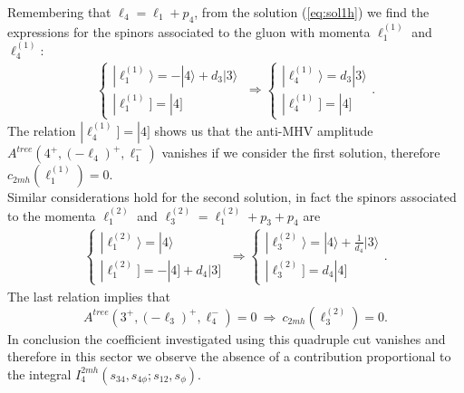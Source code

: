 Remembering that $\ell_4=\ell_1+p_4$, from the solution (\ref{eq:sol1h}) we find the expressions for the spinors associated to the gluon with momenta $\ell_1^{(1)}$ and $\ell_4^{(1)}$:
\begin{align}
	\begin{cases}
		|\ell_1^{(1)}\rangle=-|4\rangle+d_3|3\rangle \\
		|\ell_1^{(1)}]=|4]
	\end{cases} \ \Rightarrow 
	\begin{cases}
		|\ell_4^{(1)}\rangle=d_3|3\rangle \\
		|\ell_4^{(1)}]=|4]
	\end{cases}
	\label{quadA}.
\end{align}
The relation $|\ell_4^{(1)}]=|4]$ shows us that the anti-MHV amplitude $A^{tree}(4^+,(-\ell_4)^+, \ell_1^-)$ vanishes if we consider the first solution, therefore
$
	c_{2mh}(\ell_1^{(1)})=0
$.\\
Similar considerations hold for the second solution, in fact the spinors associated to the momenta $\ell_1^{(2)}$ and $\ell_3^{(2)}=\ell_1^{(2)}+p_3+p_4$ are
\begin{align}
	\begin{cases}
		|\ell_1^{(2)}\rangle=|4\rangle \\
		|\ell_1^{(2)}]=-|4]+d_4|3]
	\end{cases} \ \Rightarrow 
	\begin{cases}
		|\ell_3^{(2)}\rangle=|4\rangle+\frac{1}{d_4}|3\rangle \\
		|\ell_3^{(2)}]=d_4|4]
	\end{cases}.
	\label{quadB}
\end{align}
The last relation implies that $$A^{tree}(3^+,(-\ell_3)^+,\ell_4^-)=0\  \Rightarrow \ c_{2mh}(\ell_3^{(2)})=0.$$
In conclusion the coefficient investigated using this quadruple cut vanishes and therefore in this sector we observe the absence of a contribution proportional to the integral $I_{4}^{2mh}(s_{34},s_{4\phi};s_{12},s_\phi)$.
